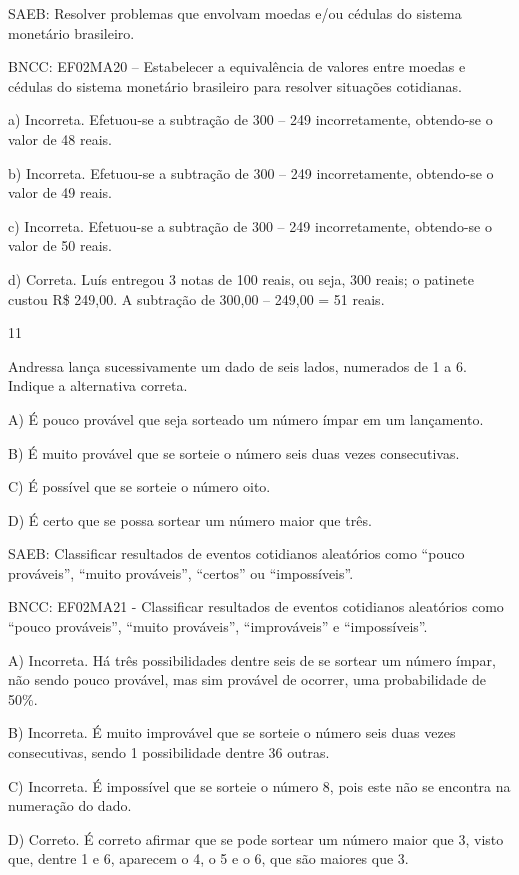 \begin{escolha}
\begin{escolha}
{{{{SAEB: Resolver problemas que envolvam moedas e/ou cédulas do
sistema monetário brasileiro. 

BNCC: EF02MA20 -- Estabelecer a
equivalência de valores entre moedas e cédulas do sistema monetário
brasileiro para resolver situações cotidianas.

a) Incorreta. Efetuou-se a subtração de 300 -- 249 incorretamente, obtendo-se o
valor de 48 reais.

b) Incorreta. Efetuou-se a subtração de 300 -- 249 incorretamente, obtendo-se o
valor de 49 reais.

c) Incorreta. Efetuou-se a subtração de 300 -- 249 incorretamente, obtendo-se o valor de 50 reais.

d) Correta. Luís entregou 3 notas de 100 reais, ou seja, 300 reais; o patinete custou R\$ 249,00. A subtração de 300,00 -- 249,00 = 51 reais.

\num{11}

Andressa lança sucessivamente um dado de seis lados, numerados de 1 a 6.
Indique a alternativa correta.

A) É pouco provável que seja sorteado um número ímpar em um lançamento.

B) É muito provável que se sorteie o número seis duas vezes
consecutivas.

C) É possível que se sorteie o número oito.

D) É certo que se possa sortear um número maior que três.

SAEB: Classificar resultados de eventos cotidianos aleatórios
como ``pouco prováveis'', ``muito prováveis'', ``certos'' ou
``impossíveis''.

BNCC: EF02MA21 - Classificar resultados de eventos cotidianos aleatórios
como ``pouco prováveis'', ``muito prováveis'', ``improváveis'' e
``impossíveis''.

A) Incorreta. Há três possibilidades dentre seis de se sortear um número
ímpar, não sendo pouco provável, mas sim provável de ocorrer, uma
probabilidade de 50\%.

B) Incorreta. É muito improvável que se sorteie o número seis duas vezes
consecutivas, sendo 1 possibilidade dentre 36 outras.

C) Incorreta. É impossível que se sorteie o número 8, pois este não se
encontra na numeração do dado.

D) Correto. É correto afirmar que se pode sortear um número maior que 3,
visto que, dentre 1 e 6, aparecem o 4, o 5 e o 6, que são maiores que 3.

}}}}
\end{escolha}
\end{escolha}
